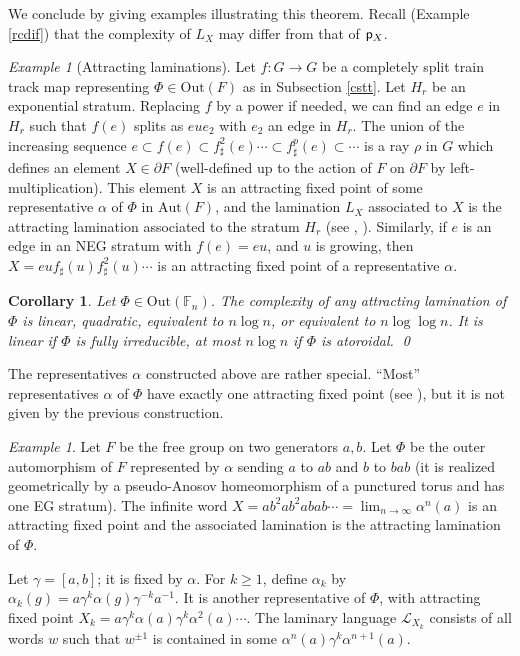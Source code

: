 \documentclass[11pt]{amsart}
\newtheorem{cor}[thm]{Corollary}
\theoremstyle{remark}
\newtheorem{example}[thm]{Example}
\newcommand{\m} {^{-1}}
\newcommand {\call} {{\mathcal {L}}}
\newcommand{\Out} {{\mathrm{Out}}}
\newcommand{\Aut} {{\mathrm{Aut}}}
\newcommand{\cp}{{\sf  p}}
\newcommand{\inc}{\subset}
\newcommand {\F} {{\mathbb {F}}}
\newcommand{\bo}{\partial}
\begin{document}
We conclude by giving examples illustrating this theorem. 
Recall (Example \ref{rcdif}) that the complexity of $L_X$ may differ from that of $\cp_X$.

\begin{example}[Attracting laminations] \label{atlam}  Let $f:G\to G$ be a completely split train track map representing $\Phi\in\Out(F)$ as in Subsection \ref{cstt}. 
Let $H_r$ be an exponential stratum. Replacing $f$ by a power if needed, we can find an edge $e$ in $H_r$ such that $f(e)$ splits as $eue_2$ with $e_2$ an edge in $H_r$. The union of the increasing sequence $e\inc f(e)\inc f^2_\sharp(e)\cdots \inc f^p_\sharp(e)\inc \cdots$ is a ray $\rho$ in $G$ which defines an element $X\in\bo F$ (well-defined up to the action of $F$ on $\bo F$ by left-multiplication). This element $X$ is an attracting fixed point of some representative $\alpha$ of $\Phi$ in $\Aut(F)$, and the lamination $L_X$ associated to $X$ is the attracting lamination associated to the stratum $H_r$ (see \cite{gafa}, \cite{Tits1}). 
Similarly, if $e$ is an edge in an NEG stratum with $f(e)=eu$, and $u$ is growing, then   $X=euf_\sharp(u)f^2_\sharp(u)\cdots$
 is an attracting fixed point of a representative $\alpha$.  
 
 \end{example}
 
 
 \begin{cor}\label{corlam}  Let $\Phi\in\Out(\F_n)$.
 The complexity of any attracting lamination of   $\Phi$ is linear, quadratic, equivalent to $n\log n$, or equivalent to $n\log \log n$. It is linear if $\Phi$ is fully irreducible, at most $n\log n$ if $\Phi$ is atoroidal. \qed
\end{cor}
 
 The representatives $\alpha$ constructed above are rather special. ``Most'' representatives $\alpha$ of $\Phi$ have exactly one attracting fixed point    (see \cite{most}), but it is not given by the previous construction. 
 
     
\begin{example}\label{lamiex}
 Let $F$ be the free group on two generators $a,b$. Let $\Phi$ be the outer automorphism of $F$ represented by $\alpha$ sending $a$ to $ab$ and $b$ to $bab$ (it is realized geometrically by a pseudo-Anosov homeomorphism of a punctured torus and has one EG stratum). 
 The infinite word $X=ab^2ab^2abab\cdots=\lim_{n\to\infty}\alpha^n(a)$ is an attracting fixed point and the associated lamination is the attracting lamination of $\Phi$.
 
 Let   $\gamma=[a,b]$;  it is fixed by $\alpha$.   For $k\ge1$, define $\alpha_k$ by $\alpha_k(g)=a\gamma^k\alpha(g)\gamma^{-k} a\m$. It is another representative of $\Phi$, with attracting fixed point $X_k=a\gamma^k\alpha(a)\gamma^k \alpha^2(a)\cdots$. The laminary language $\call_{X_k}$ consists of  
 all words $w$ such that $w^{\pm1}$ is contained in some $\alpha^n(a)\gamma^k\alpha^{n+1}(a)$. 
\end{example}
 
\end{document}
